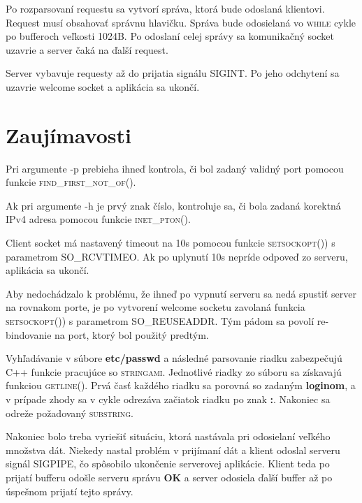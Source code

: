 \documentclass[a4paper, 11pt]{article}
\begin{document}
Po rozparsovaní requestu sa vytvorí správa, ktorá bude odoslaná klientovi. Request musí obsahovať správnu hlavičku. Správa bude odosielaná vo \textsc{while} cykle po bufferoch veľkosti 1024B. Po odoslaní celej správy sa komunikačný socket uzavrie a server čaká na ďalší request.

Server vybavuje requesty až do prijatia signálu \textsc{SIGINT}. Po jeho odchytení sa uzavrie welcome socket a aplikácia sa ukončí.

\section{Zaujímavosti}
Pri argumente -p prebieha ihneď kontrola, či bol zadaný validný port pomocou funkcie \textsc{find\_first\_not\_of()}.

Ak pri argumente -h je prvý znak číslo, kontroluje sa, či bola zadaná korektná IPv4 adresa pomocou funkcie \textsc{inet\_pton()}.

Client socket má nastavený timeout na 10s pomocou funkcie \textsc{setsockopt()}) s parametrom \textsc{SO\_RCVTIMEO}. Ak po uplynutí 10s nepríde odpoveď zo serveru, aplikácia sa ukončí.

Aby nedochádzalo k problému, že ihneď po vypnutí serveru sa nedá spustiť server na rovnakom porte, je po vytvorení welcome socketu zavolaná funkcia \textsc{setsockopt()}) s parametrom \textsc{SO\_REUSEADDR}. Tým pádom sa povolí re-bindovanie na port, ktorý bol použitý predtým.

Vyhľadávanie v súbore \textbf{etc/passwd} a následné parsovanie riadku zabezpečujú \textsc{C++} funkcie pracujúce so \textsc{stringami}. Jednotlivé riadky zo súboru sa získavajú funkciou \textsc{getline()}. Prvá časť každého riadku sa porovná so zadaným \textbf{loginom}, a v prípade zhody sa v cykle odrezáva začiatok riadku po znak \textbf{:}. Nakoniec sa odreže požadovaný \textsc{substring}.

Nakoniec bolo treba vyriešiť situáciu, ktorá nastávala pri odosielaní veľkého množstva dát. Niekedy nastal problém v prijímaní dát a klient odoslal serveru signál \textsc{SIGPIPE}, čo spôsobilo ukončenie serverovej aplikácie. Klient teda po prijatí bufferu odošle serveru správu \textbf{OK} a server odosiela ďalší buffer až po úspešnom prijatí tejto správy.
\end{document}
